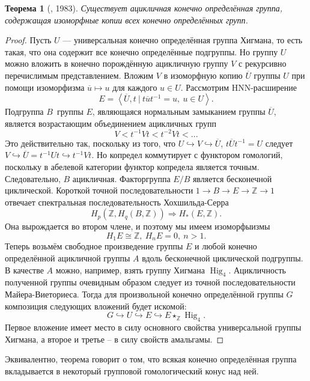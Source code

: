 \documentclass[14pt, dvipsnames]{extarticle}
\newtheorem{theorem}{Теорема}
\theoremstyle{definition}
\theoremstyle{remark}
\DeclareMathOperator{\Hig}{\mathrm{Hig}}
\begin{document}
\begin{theorem}[\cite{BousfieldUniversal}, 1983]
Существует ацикличная конечно определённая группа, содержащая изоморфные копии всех конечно определённых групп.
\end{theorem}  

\begin{proof}

Пусть $U$ --- универсальная конечно определённая группа Хигмана, то есть такая, что она содержит все конечно определённые подгруппы. Но группу $U$ можно вложить в конечно порождённую ацикличную группу $V$ с рекурсивно перечислимым представлением. Вложим $V$ в изоморфную копию $\overline{U}$ группы $U$ при помощи изоморфизма $\overline{u}\mapsto u$ для каждого $u\in U$. Рассмотрим HNN-расширение $$E=\left \langle \overline{U}, t\ | \ t\overline{u}t^{-1} = u, \ u\in U  \right \rangle.$$ Подгруппа $B$ группы $E$, являющаяся нормальным замыканием группы $\overline{U}$, является возрастающим объединением ацикличных групп $$V < t^{-1} V t < t^{-2} V t < ...$$ Это действительно так, поскольку из того, что $U\hookrightarrow V\hookrightarrow \overline{U}$, $t\overline{U}t^{-1} = U$ следует $V\hookrightarrow \overline{U} = t^{-1}Ut\hookrightarrow t^{-1}Vt$. Но копредел коммутирует с функтором гомологий, поскольку в абелевой категории функтор копредела является точным. Следовательно, $B$ ацикличная. Факторгруппа $E/B$ является бесконечной циклической. Короткой точной последовательности $1\to B\to E\to \mathbb{Z}\to 1$ отвечает спектральная последовательность Хохшильда-Серра $$H_p(\mathbb{Z}, H_q(B, \mathbb{Z}))\Rightarrow H_\ast(E, \mathbb{Z}).$$ Она вырождается во втором члене, и поэтому мы имеем изоморфыизмы $$H_1E\cong\mathbb{Z},\ H_nE = 0, \ n > 1.$$ Теперь возьмём свободное произведение группы $E$ и любой конечно определённой ацикличной группы $A$ вдоль бесконечной циклической подгруппы. В качестве $A$ можно, например, взять группу Хигмана $\Hig_4$. Ацикличность полученной группы очевидным образом следует из точной последовательности Майера-Виеториеса. Тогда для произвольной конечно определённой группы $G$ композиция следующих вложений будет искомой: $$G\hookrightarrow U\hookrightarrow E\hookrightarrow E\star_{\mathbb{Z}}\Hig_4.$$ Первое вложение имеет место в силу основного свойства универсальной группы Хигмана, а второе и третье -- в силу свойств амальгамы.      

\end{proof}



Эквивалентно, теорема говорит о том, что всякая конечно определённая группа вкладывается в некоторый групповой гомологический конус над ней. 
\end{document}
